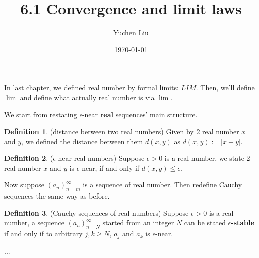 \documentclass{article}
\title{6.1 Convergence and limit laws}
\author{Yuchen Liu}
\date{\today}
\begin{document}
\maketitle

\par In last chapter, we defined real number by formal limits: $LIM$. Then, we'll define $\lim$ and define what actually real number is via $\lim$.
\par We start from restating $\epsilon$-near \textbf{real} sequences' main structure.
\theoremstyle{definition}
\newtheorem{definition}{Definition}
\begin{definition}
    (distance between two real numbers) Given by 2 real number $x$ and $y$, we defined the distance between them $d(x,y)$ as $d(x,y) := |x-y|$.
\end{definition}
\begin{definition}
    ($\epsilon$-near real numbers) Suppose $\epsilon > 0$ is a real number, we state 2 real number $x$ and $y$ is $\epsilon$-near, if and only if $d(x,y) \leqslant \epsilon$.
\end{definition}
\par Now suppose $(a_n)_{n=m}^{\infty}$ is a sequence of real number. Then redefine Cauchy sequences the same way as before.
\begin{definition}
    (Cauchy sequences of real numbers) Suppose $\epsilon > 0$ is a real number, a sequence $(a_n)_{n=N}^{\infty}$ started from an integer $N$ can be stated \textbf{$\epsilon$-stable} if and only if to arbitrary $j,k \geq N$, $a_j$ and $a_k$ is $\epsilon$-near.
\end{definition}
...
\end{document}
